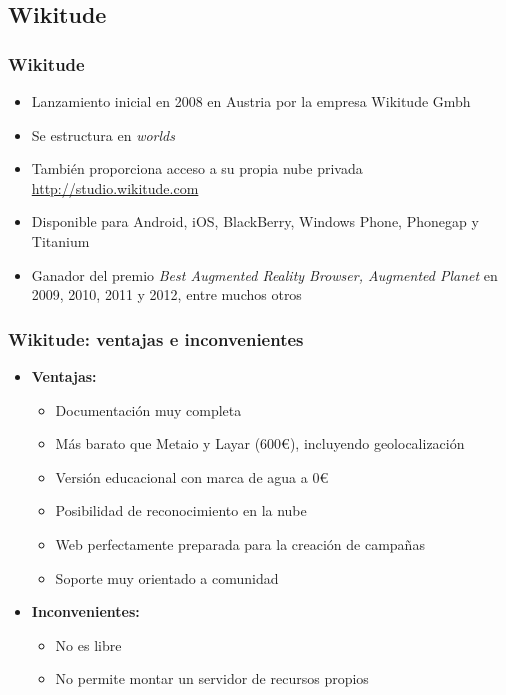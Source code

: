 \subsection*{Wikitude}
\frame
{
\frametitle{Wikitude}
\begin{itemize}
 \item Lanzamiento inicial en 2008 en Austria por la empresa Wikitude Gmbh
 \item Se estructura en \textit{worlds}
 \item También proporciona acceso a su propia nube privada\\
   \url{http://studio.wikitude.com}
 \item Disponible para Android, iOS, BlackBerry, Windows Phone, Phonegap y Titanium
 \item Ganador del premio \textit{Best Augmented Reality Browser, Augmented Planet} en 2009, 2010, 2011 y 2012, entre muchos otros
\end{itemize}
}

\frame
{
\frametitle{Wikitude: ventajas e inconvenientes}
\begin{itemize}
\item \textbf{Ventajas:}
  \begin{itemize}
   \item Documentación muy completa
   \item Más barato que Metaio y Layar (600\euro), incluyendo geolocalización
   \item Versión educacional con marca de agua a 0\euro
   \item Posibilidad de reconocimiento en la nube
   \item Web perfectamente preparada para la creación de campañas
   \item Soporte muy orientado a comunidad
  \end{itemize}

\item \textbf{Inconvenientes:}
  \begin{itemize}
   \item No es libre
   \item No permite montar un servidor de recursos propios
  \end{itemize}

\end{itemize}
}

